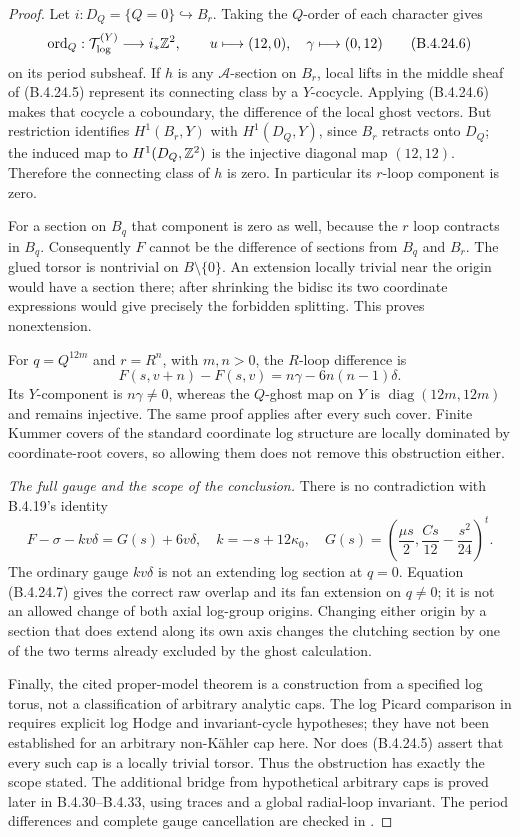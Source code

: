 \begin{proof}
Let $i:D_Q=\{Q=0\}\hookrightarrow B_r$.
Taking the $Q$-order of each character gives
\[
 \operatorname{ord}_Q:
 \mathcal T_{\log}^{(Y)}\longrightarrow i_*\mathbb Z^2,
 \qquad
 u\longmapsto(12,0),\quad
 \gamma\longmapsto(0,12)
 \tag{B.4.24.6}
\]
on its period subsheaf. If $h$ is any
$\mathcal A$-section on $B_r$, local lifts in
the middle sheaf of (B.4.24.5) represent its
connecting class by a $Y$-cocycle. Applying
(B.4.24.6) makes that cocycle a coboundary,
the difference of the local ghost vectors.
But restriction identifies $H^1(B_r,Y)$ with
$H^1(D_Q,Y)$, since $B_r$ retracts onto $D_Q$;
the induced map to $H^1(D_Q,\mathbb Z^2)$ is the
injective diagonal map $(12,12)$. Therefore
the connecting class of $h$ is zero. In
particular its $r$-loop component is zero.

For a section on $B_q$ that component is zero
as well, because the $r$ loop contracts in $B_q$.
Consequently $F$ cannot be the difference of
sections from $B_q$ and $B_r$. The glued torsor
is nontrivial on $B\setminus\{0\}$. An extension
locally trivial near the origin would have a
section there; after shrinking the bidisc its
two coordinate expressions would give precisely
the forbidden splitting. This proves nonextension.

For $q=Q^{12m}$ and $r=R^n$, with $m,n>0$,
the $R$-loop difference is
\[
 F(s,v+n)-F(s,v)
    =n\gamma-6n(n-1)\delta.
\]
Its $Y$-component is $n\gamma\ne0$,
whereas the $Q$-ghost map on $Y$ is
$\operatorname{diag}(12m,12m)$ and remains
injective. The same proof applies after every
such cover. Finite Kummer covers of the standard
coordinate log structure are locally dominated
by coordinate-root covers, so allowing them
does not remove this obstruction either.

\emph{The full gauge and the scope of the conclusion.}
There is no contradiction with B.4.19's identity
\[
 F-\sigma-kv\delta=G(s)+6v\delta,
 \quad k=-s+12\kappa_0,
 \quad G(s)=\left(\frac{\mu s}2,
                  \frac{Cs}{12}-\frac{s^2}{24}\right)^t.
 \tag{B.4.24.7}
\]
The ordinary gauge $kv\delta$ is not an extending
log section at $q=0$. Equation (B.4.24.7) gives
the correct raw overlap and its fan extension
on $q\ne0$; it is not an allowed change of
both axial log-group origins. Changing either
origin by a section that does extend along its
own axis changes the clutching section by one
of the two terms already excluded by the
ghost calculation.

Finally, the cited proper-model theorem is a
construction from a specified log torus, not
a classification of arbitrary analytic caps.
The log Picard comparison in
\citet[Sections 7--9]{KKN2008PicardE} requires
explicit log Hodge and invariant-cycle hypotheses;
they have not been established for an arbitrary
non-K\"ahler cap here. Nor does (B.4.24.5)
assert that every such cap is a locally trivial
torsor. Thus the obstruction has exactly the
scope stated. The additional bridge from hypothetical
arbitrary caps is proved later in B.4.30--B.4.33,
using traces and a global radial-loop invariant.
The period differences and complete
gauge cancellation are checked in
.
\end{proof}
